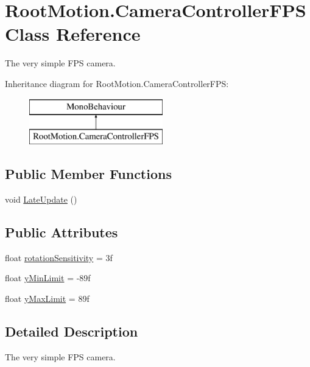 \hypertarget{class_root_motion_1_1_camera_controller_f_p_s}{}\section{Root\+Motion.\+Camera\+Controller\+F\+PS Class Reference}
\label{class_root_motion_1_1_camera_controller_f_p_s}


The very simple F\+PS camera.  


Inheritance diagram for Root\+Motion.\+Camera\+Controller\+F\+PS\+:\begin{figure}[H]
\begin{center}
\leavevmode
\includegraphics[height=2.000000cm]{class_root_motion_1_1_camera_controller_f_p_s}
\end{center}
\end{figure}
\subsection*{Public Member Functions}
\begin{DoxyCompactItemize}
\item 
void \mbox{\hyperlink{class_root_motion_1_1_camera_controller_f_p_s_a81782b39ad90accc04c5a14ea21e059a}{Late\+Update}} ()
\end{DoxyCompactItemize}
\subsection*{Public Attributes}
\begin{DoxyCompactItemize}
\item 
float \mbox{\hyperlink{class_root_motion_1_1_camera_controller_f_p_s_a6fdcbc65c25ca1d20aa75db55424b2b3}{rotation\+Sensitivity}} = 3f
\item 
float \mbox{\hyperlink{class_root_motion_1_1_camera_controller_f_p_s_a1eca88254a7bae7212eb0fa7d59d023b}{y\+Min\+Limit}} = -\/89f
\item 
float \mbox{\hyperlink{class_root_motion_1_1_camera_controller_f_p_s_a253ae758f1b2ff3961b5077ff6f033ff}{y\+Max\+Limit}} = 89f
\end{DoxyCompactItemize}


\subsection{Detailed Description}
The very simple F\+PS camera. 



